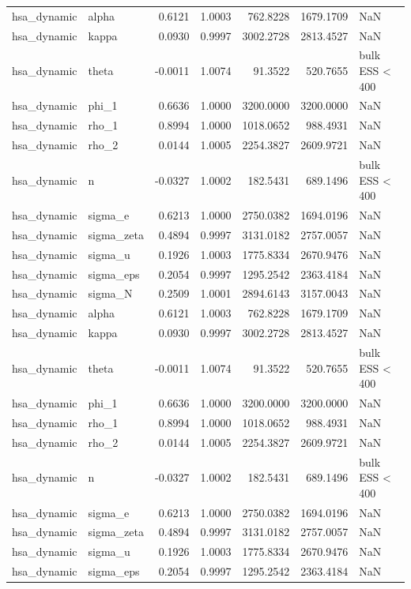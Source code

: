\begin{tabular}{llrrrrl}
hsa\_dynamic & alpha & 0.6121 & 1.0003 & 762.8228 & 1679.1709 & NaN \\
hsa\_dynamic & kappa & 0.0930 & 0.9997 & 3002.2728 & 2813.4527 & NaN \\
hsa\_dynamic & theta & -0.0011 & 1.0074 & 91.3522 & 520.7655 & bulk ESS < 400 \\
hsa\_dynamic & phi\_1 & 0.6636 & 1.0000 & 3200.0000 & 3200.0000 & NaN \\
hsa\_dynamic & rho\_1 & 0.8994 & 1.0000 & 1018.0652 & 988.4931 & NaN \\
hsa\_dynamic & rho\_2 & 0.0144 & 1.0005 & 2254.3827 & 2609.9721 & NaN \\
hsa\_dynamic & n & -0.0327 & 1.0002 & 182.5431 & 689.1496 & bulk ESS < 400 \\
hsa\_dynamic & sigma\_e & 0.6213 & 1.0000 & 2750.0382 & 1694.0196 & NaN \\
hsa\_dynamic & sigma\_zeta & 0.4894 & 0.9997 & 3131.0182 & 2757.0057 & NaN \\
hsa\_dynamic & sigma\_u & 0.1926 & 1.0003 & 1775.8334 & 2670.9476 & NaN \\
hsa\_dynamic & sigma\_eps & 0.2054 & 0.9997 & 1295.2542 & 2363.4184 & NaN \\
hsa\_dynamic & sigma\_N & 0.2509 & 1.0001 & 2894.6143 & 3157.0043 & NaN \\
hsa\_dynamic & alpha & 0.6121 & 1.0003 & 762.8228 & 1679.1709 & NaN \\
hsa\_dynamic & kappa & 0.0930 & 0.9997 & 3002.2728 & 2813.4527 & NaN \\
hsa\_dynamic & theta & -0.0011 & 1.0074 & 91.3522 & 520.7655 & bulk ESS < 400 \\
hsa\_dynamic & phi\_1 & 0.6636 & 1.0000 & 3200.0000 & 3200.0000 & NaN \\
hsa\_dynamic & rho\_1 & 0.8994 & 1.0000 & 1018.0652 & 988.4931 & NaN \\
hsa\_dynamic & rho\_2 & 0.0144 & 1.0005 & 2254.3827 & 2609.9721 & NaN \\
hsa\_dynamic & n & -0.0327 & 1.0002 & 182.5431 & 689.1496 & bulk ESS < 400 \\
hsa\_dynamic & sigma\_e & 0.6213 & 1.0000 & 2750.0382 & 1694.0196 & NaN \\
hsa\_dynamic & sigma\_zeta & 0.4894 & 0.9997 & 3131.0182 & 2757.0057 & NaN \\
hsa\_dynamic & sigma\_u & 0.1926 & 1.0003 & 1775.8334 & 2670.9476 & NaN \\
hsa\_dynamic & sigma\_eps & 0.2054 & 0.9997 & 1295.2542 & 2363.4184 & NaN \\

\end{tabular}

